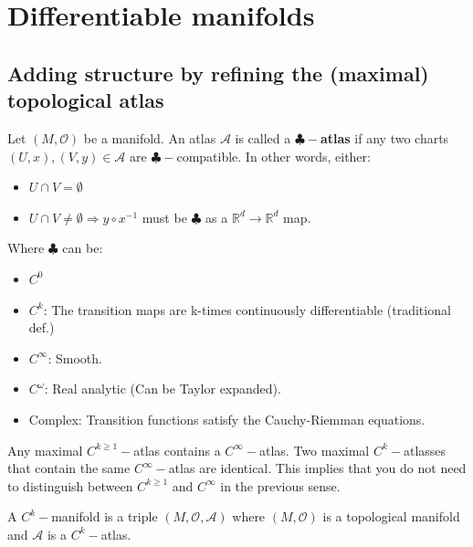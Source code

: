 \documentclass[root.tex]{subfiles}
\begin{document}

\chapter{Differentiable manifolds}%
\section{Adding structure by refining the (maximal) topological atlas}
\begin{mydef}
  Let $(M, \mathcal{O})$ be a manifold. An atlas $\mathcal{A}$ is called a $\clubsuit-$\textbf{atlas} if any two charts $(U,x), (V,y) \in \mathcal{A}$ are $\clubsuit-$compatible. In other words, either:
  \begin{itemize}
    \item $U\cap V = \emptyset$
    \item $U\cap V \neq \emptyset \Rightarrow y\circ x^{-1}$ must be $\clubsuit$ as a $\mathbb{R}^d \to \mathbb{R}^d$ map.
  \end{itemize}
  Where $\clubsuit$ can be:
  \begin{itemize}
    \item $C^0$
    \item $C^k$: The transition maps are k-times continuously differentiable (traditional def.)
    \item $C^\infty$: Smooth.
    \item $C^\omega$: Real analytic (Can be Taylor expanded).
    \item Complex: Transition functions satisfy the Cauchy-Riemman equations.
  \end{itemize}
\end{mydef}
\begin{theorem}
  Any maximal $C^{k\geq 1}-$atlas contains a $C^\infty -$atlas. Two maximal $C^k-$atlasses that contain the same $C^\infty-$atlas are identical. This implies that you do not need to distinguish between $C^{k\geq 1}$ and $C^\infty$ in the previous sense.
\end{theorem}

\begin{mydef}
  A $C^k-$manifold is a triple $(M, \mathcal{O}, \mathcal{A})$ where $(M,\mathcal{O})$ is a topological manifold and $\mathcal{A}$ is a $C^k-$atlas.
\end{mydef}
\end{document}
